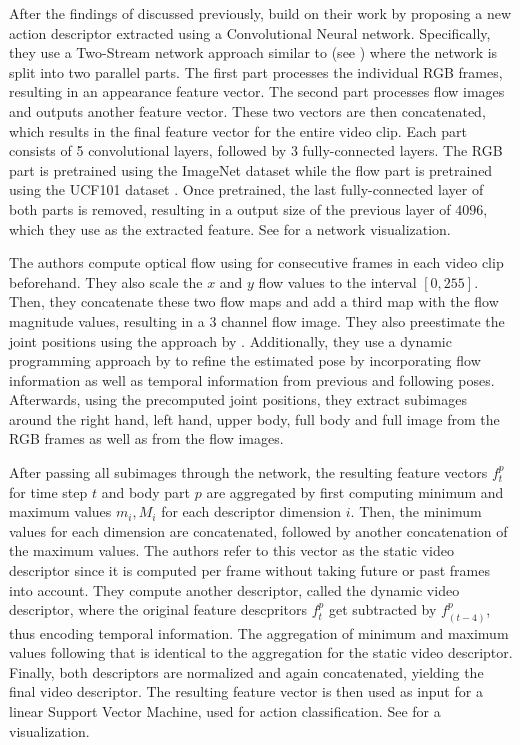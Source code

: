After the findings of \cite{jhuang_towards_2013} discussed previously, \cite{cheron_pcnn_2015} build on their work by proposing a new action descriptor extracted using a Convolutional Neural network.
Specifically, they use a Two-Stream network approach similar to \cite{simonyan_two-stream_2014} (see ) where the network is split into two parallel parts.
The first part processes the individual RGB frames, resulting in an appearance feature vector. 
The second part processes flow images and outputs another feature vector. 
These two vectors are then concatenated, which results in the final feature vector for the entire video clip. 
Each part consists of 5 convolutional layers, followed by 3 fully-connected layers. The RGB part is pretrained using the ImageNet dataset \cite{deng_imagenet:_2009} while the flow part is pretrained using the UCF101 dataset \cite{soomro_ucf101:_2012}. 
Once pretrained, the last fully-connected layer of both parts is removed, resulting in a output size of the previous layer of $4096$, which they use as the extracted feature.
See  for a network visualization.

The authors compute optical flow using \cite{brox_high_2004} for consecutive frames in each video clip beforehand.
They also scale the $x$ and $y$ flow values to the interval $[0, 255]$.
Then, they concatenate these two flow maps and add a third map with the flow magnitude values, resulting in a $3$ channel flow image.
They also preestimate the joint positions using the approach by \cite{yang_articulated_2011}.
Additionally, they use a dynamic programming approach by \cite{cherian_mixing_2014} to refine the estimated pose by incorporating flow information as well as temporal information from previous and following poses.
Afterwards, using the precomputed joint positions, they extract subimages around the right hand, left hand, upper body, full body and full image from the RGB frames as well as from the flow images.

After passing all subimages through the network, the resulting feature vectors $f_t^p$ for time step $t$ and body part $p$ are aggregated by first computing minimum and maximum values $m_i, M_i$ for each descriptor dimension $i$.
Then, the minimum values for each dimension are concatenated, followed by another concatenation of the maximum values.
The authors refer to this vector as the static video descriptor since it is computed per frame without taking future or past frames into account.
They compute another descriptor, called the dynamic video descriptor, where the original feature descpritors $f_t^p$ get subtracted by $f_{(t-4)}^p$, thus encoding temporal information.
The aggregation of minimum and maximum values following that is identical to the aggregation for the static video descriptor.
Finally, both descriptors are normalized and again concatenated, yielding the final video descriptor.
The resulting feature vector is then used as input for a linear Support Vector Machine, used for action classification.
See  for a visualization.

